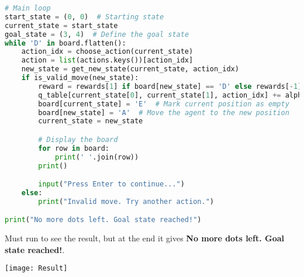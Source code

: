 \documentclass[12pt,onecolumn,a4paper]{article}
\begin{document}
\begin{lstlisting}[language=Python]
# Main loop
start_state = (0, 0)  # Starting state
current_state = start_state
goal_state = (3, 4)  # Define the goal state
while 'D' in board.flatten():
    action_idx = choose_action(current_state)
    action = list(actions.keys())[action_idx]
    new_state = get_new_state(current_state, action_idx)
    if is_valid_move(new_state):
        reward = rewards[1] if board[new_state] == 'D' else rewards[-1]
        q_table[current_state[0], current_state[1], action_idx] += alpha * (reward + gamma * np.max(q_table[new_state]) - q_table[current_state[0], current_state[1], action_idx])
        board[current_state] = 'E'  # Mark current position as empty
        board[new_state] = 'A'  # Move the agent to the new position
        current_state = new_state

        # Display the board
        for row in board:
            print(' '.join(row))
        print()

        input("Press Enter to continue...")
    else:
        print("Invalid move. Try another action.")

print("No more dots left. Goal state reached!")
\end{lstlisting}
Must run to see the result, but at the end it gives \textbf{No more dots left. Goal state reached!}.\\
\begin{center}
\texttt{[image: Result]}
\end{center}
\end{document}
